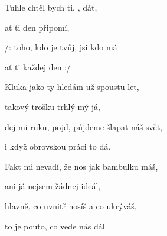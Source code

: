 

\zr
Tuhle  chtěl bych ti, , dát,

ať ti  den připomí,

/: toho, {kdo} je tvůj,  jsi  kdo má 

ať ti každej den  :/
\kr

\zs
{Kluka} jako ty hledám už {spoustu} let,

tako{vý} trošku trhlý mý {já},

dej mi {ruku}, pojď, půjdeme {šlapat} náš {svět},

{i} když obrovskou {práci} to {dá}.
\ks

\zr
\kr

\zs
Fakt mi nevadí, že nos jak bambulku máš,

ani já nejsem žádnej ideál,

hlavně, co uvnitř nosíš a co ukrýváš,

to je pouto, co vede nás dál.
\ks

\zr
\kr

\kp


























